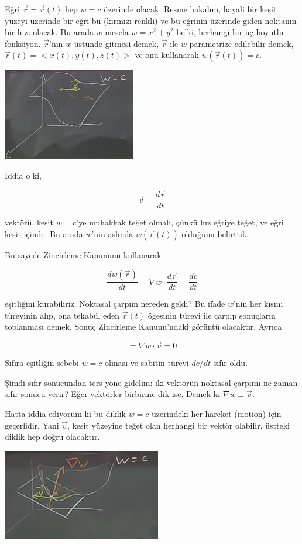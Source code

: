 \documentclass[12pt,fleqn]{article}\usepackage{../../common}
\begin{document}
Eğri $\vec{r} = \vec{r}(t)$ hep $w = c$ üzerinde olacak. Resme bakalım,
hayali bir kesit yüzeyi üzerinde bir eğri bu (kırmızı renkli) ve bu eğrinin
üzerinde giden noktanın bir hızı olacak. Bu arada $w$ mesela $w = x^2 +
y^2$ belki, herhangi bir üç boyutlu fonksiyon. $\vec{r}$'nin $w$ üstünde
gitmesi demek, $\vec{r}$ ile $w$ parametrize edilebilir demek, $\vec{r}(t)
= < x(t),y(t),z(t) >$ ve onu kullanarak $w(\vec{r}(t)) = c$.

\includegraphics[height=4cm]{12_3.jpg}

İddia o ki, 

$$ \vec{v} = \frac{d\vec{r}}{dt} $$

vektörü, kesit $w = c$'ye muhakkak teğet olmalı, çünkü hız eğriye teğet, ve
eğri kesit içinde. Bu arada $w$'nin aslında $w(\vec{r}(t))$ olduğunu
belirttik.

Bu sayede Zincirleme Kanununu kullanarak 

$$ \frac{dw(\vec{r})}{dt} = \nabla w \cdot \frac{d\vec{r}}{dt} = \frac{dc}{dt}$$

eşitliğini kurabiliriz. Noktasal çarpım nereden geldi? Bu ifade $w$'nin
her kısmi türevinin alıp, ona tekabül eden $\vec{r}(t)$ öğesinin türevi ile
çarpıp sonuçların toplanması demek. Sonuç Zincirleme Kanunu'ndaki görüntü
olacaktır. Ayrıca

$$  = \nabla w \cdot \vec{v} = 0$$

Sıfıra eşitliğin sebebi $w = c$ olması ve sabitin türevi $dc/dt$ sıfır oldu. 

Şimdi sıfır sonucundan ters yöne gidelim: iki vektörün noktasal çarpımı ne zaman
sıfır sonucu verir? Eğer vektörler birbirine dik ise. Demek ki $\nabla w \perp
\vec{v}$.

Hatta iddia ediyorum ki bu diklik $w=c$ üzerindeki her hareket (motion)
için geçerlidir. Yani $\vec{v}$, kesit yüzeyine teğet olan herhangi bir
vektör olabilir, üstteki diklik hep doğru olacaktır.

\includegraphics[height=4cm]{12_4.png}
\end{document}

